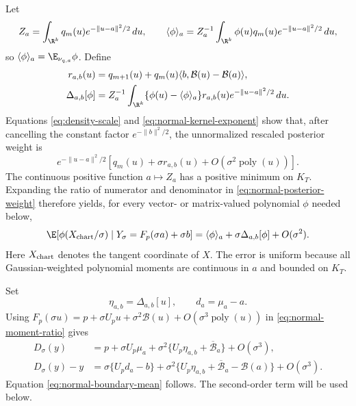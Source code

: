 Let
\begin{equation}
  Z_a=\int_{\R^k}q_m(u)e^{-\|u-a\|^2/2}\,du,
  \qquad
  \langle\phi\rangle_a
  =Z_a^{-1}\int_{\R^k}
   \phi(u)q_m(u)e^{-\|u-a\|^2/2}\,du,
\end{equation}
so $\langle\phi\rangle_a=\E_{\nu_{q,a}}\phi$.  Define
\begin{align}
  r_{a,b}(u)
  &=
  q_{m+1}(u)
  +q_m(u)\langle b,\mathcal B(u)-\mathcal B(a)\rangle,
  \label{eq:normal-first-weight}\\
  \Delta_{a,b}[\phi]
  &=
  Z_a^{-1}\int_{\R^k}
  \{\phi(u)-\langle\phi\rangle_a\}
  r_{a,b}(u)e^{-\|u-a\|^2/2}\,du.
  \label{eq:normal-delta}
\end{align}
Equations \eqref{eq:density-scale} and
\eqref{eq:normal-kernel-exponent} show that, after cancelling the
constant factor $e^{-\|b\|^2/2}$, the unnormalized rescaled posterior
weight is
\begin{equation}
  e^{-\|u-a\|^2/2}
  \left[
    q_m(u)+\sigma r_{a,b}(u)
    +O(\sigma^2\operatorname{poly}(u))
  \right].
  \label{eq:normal-posterior-weight}
\end{equation}
The continuous positive function $a\mapsto Z_a$ has a positive minimum
on $K_T$.  Expanding the ratio of numerator and denominator in
\eqref{eq:normal-posterior-weight} therefore yields, for every
vector- or matrix-valued polynomial $\phi$ needed below,
\begin{equation}
  \E[\phi(X_{\rm chart}/\sigma)\mid
      Y_\sigma=F_p(\sigma a)+\sigma b]
  =
  \langle\phi\rangle_a
  +\sigma\Delta_{a,b}[\phi]
  +O(\sigma^2).
  \label{eq:normal-moment-ratio}
\end{equation}
Here $X_{\rm chart}$ denotes the tangent coordinate of $X$.
The error is uniform because all Gaussian-weighted polynomial moments
are continuous in $a$ and bounded on $K_T$.

Set
\begin{equation}
  \eta_{a,b}=\Delta_{a,b}[u],
  \qquad d_a=\mu_a-a.
\end{equation}
Using
$F_p(\sigma u)=p+\sigma U_pu+\sigma^2\mathcal B(u)
+O(\sigma^3\operatorname{poly}(u))$ in
\eqref{eq:normal-moment-ratio} gives
\begin{align}
  D_\sigma(y)
  &=
  p+\sigma U_p\mu_a
  +\sigma^2\{U_p\eta_{a,b}+\overline{\mathcal B}_a\}
  +O(\sigma^3),\label{eq:normal-mean-second}\\
  D_\sigma(y)-y
  &=
  \sigma\{U_pd_a-b\}
  +\sigma^2\{
     U_p\eta_{a,b}
     +\overline{\mathcal B}_a-\mathcal B(a)
   \}
  +O(\sigma^3).
  \label{eq:normal-displacement-second}
\end{align}
Equation \eqref{eq:normal-boundary-mean} follows.  The second-order term will be used below.

